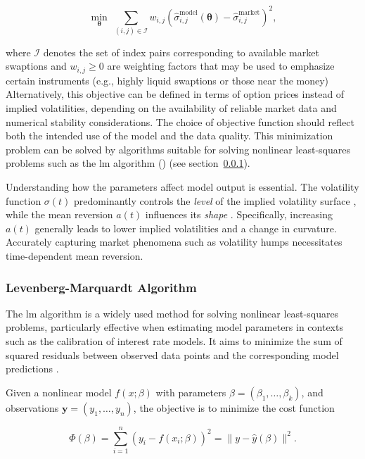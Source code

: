 \begin{equation}
	\min_{\boldsymbol{\theta}} \; \sum_{(i,j) \in \mathcal{I}} w_{i,j} \left( \hat{\sigma}^{\text{model}}_{i,j}(\boldsymbol{\theta}) - \hat{\sigma}^{\text{market}}_{i,j} \right)^2,
\end{equation}

where $\mathcal{I}$ denotes the set of index pairs corresponding to available market swaptions and $w_{i,j} \geq 0$ are weighting factors that may be used to emphasize certain instruments (e.g., highly liquid swaptions or those near the money)  Alternatively, this objective can be defined in terms of option prices instead of implied volatilities, depending on the availability of reliable market data and numerical stability considerations. The choice of objective function should reflect both the intended use of the model and the data quality. This minimization problem can be solved by algorithms suitable for solving nonlinear least-squares problems such as the \ac{lm} algorithm (\parencite{vollrath2009calibration}) (see section~\ref{lm_algorithm}).

Understanding how the parameters affect model output is essential. The volatility function $\sigma(t)$ predominantly controls the \emph{level} of the implied volatility surface \parencite[p.~9]{gurrieri2009calibration}, while the mean reversion $a(t)$ influences its \emph{shape} \parencite[p.~9]{gurrieri2009calibration}. Specifically, increasing $a(t)$ generally leads to lower implied volatilities and a change in curvature. Accurately capturing market phenomena such as volatility humps necessitates time-dependent mean reversion.

\subsubsection{Levenberg-Marquardt Algorithm} \label{lm_algorithm}
The \ac{lm} algorithm is a widely used method for solving nonlinear least-squares problems, particularly effective when estimating model parameters in contexts such as the calibration of interest rate models. It aims to minimize the sum of squared residuals between observed data points and the corresponding model predictions \parencite{marquardt1963}.

Given a nonlinear model $f(x; \beta)$ with parameters $\beta = (\beta_1, \dots, \beta_k)$, and observations $\mathbf{y} = (y_1, \dots, y_n)$, the objective is to minimize the cost function

\begin{equation}
	\Phi(\beta) = \sum_{i=1}^{n} \left( y_i - f(x_i; \beta) \right)^2 = \| y - \hat{y}(\beta) \|^2.
\end{equation}

